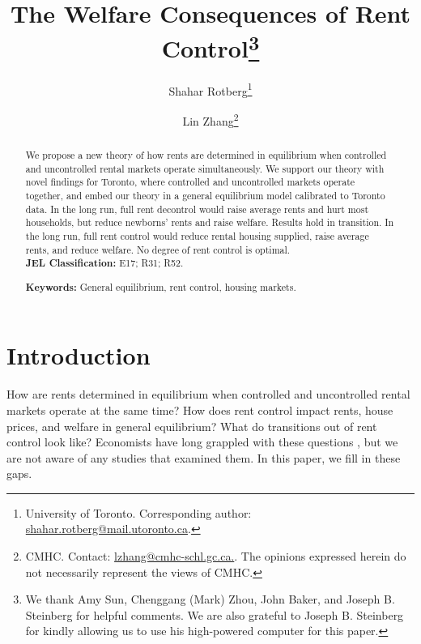 \documentclass[parskip=full]{article}
\author{Shahar Rotberg\footnote{University of Toronto. Corresponding author: \url{shahar.rotberg@mail.utoronto.ca}.} \and Lin Zhang\footnote{CMHC. Contact: \url{lzhang@cmhc-schl.gc.ca.}. The opinions expressed herein do not necessarily represent the views of CMHC.}}
\title{\vspace{-1.8cm}The Welfare Consequences of Rent Control\footnote{We thank Amy Sun, Chenggang (Mark) Zhou, John Baker, and Joseph B. Steinberg for helpful comments. We are also grateful to Joseph B. Steinberg for kindly allowing us to use his high-powered computer for this paper.}}
\begin{document}
\maketitle

\begin{abstract}
\onehalfspacing
\noindent We propose a new theory of how rents are determined in equilibrium when controlled and uncontrolled rental markets operate simultaneously. We support our theory with novel findings for Toronto, where controlled and uncontrolled markets operate together, and embed our theory in a general equilibrium model calibrated to Toronto data. In the long run, full rent decontrol would raise average rents and hurt most households, but reduce newborns' rents and raise welfare. Results hold in transition. In the long run, full rent control would reduce rental housing supplied, raise average rents, and reduce welfare. No degree of rent control is optimal.
\\[1.5ex]

\noindent \textbf{JEL Classification:} E17; R31; R52. 

\noindent \textbf{Keywords:} General equilibrium, rent control, housing markets.
\end{abstract}

\section{Introduction}

How are rents determined in equilibrium when controlled and uncontrolled rental markets operate at the same time? How does rent control impact rents, house prices, and welfare in general equilibrium? What do transitions out of rent control look like? Economists have long grappled with these questions \citep{fraser-1981,arnott-1995}, but we are not aware of any studies that examined them. In this paper, we fill in these gaps.
\end{document}
